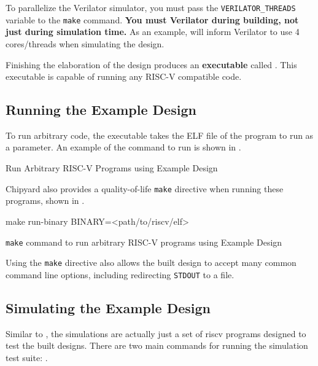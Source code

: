 \begin{blackbox}
  To parallelize the Verilator simulator, you must pass the \texttt{VERILATOR\_THREADS} variable to the \texttt{make} command.
  \textbf{You must  Verilator during building, not just during simulation time.}
  As an example,  will inform Verilator to use 4 cores/threads when simulating the design.
\end{blackbox}

Finishing the \gls{elaboration} of the design produces an \textbf{executable} called .
This executable is capable of running any RISC-V compatible code.

\subsection{Running the Example Design}\label{sec:Running_Example_Design}
To run arbitrary code, the executable takes the ELF file of the program to run as a parameter.
An example of the command to run is shown in .

\begin{listing}[h!tbp]
\caption{Run Arbitrary RISC-V Programs using Example Design}
\label{lst:Running_Example_Design}
\end{listing}

Chipyard also provides a quality-of-life \texttt{make} directive when running these programs, shown in .

\begin{listing}[h!tbp]
\begin{bashsource}
make run-binary BINARY=<path/to/riscv/elf>
\end{bashsource}
\caption{\texttt{make} command to run arbitrary RISC-V programs using Example Design}
\label{lst:Running_Example_Design-Make}
\end{listing}

Using the \texttt{make} directive also allows the built design to accept many common command line options, including redirecting \texttt{STDOUT} to a file.

\subsection{Simulating the Example Design}\label{sec:Simulating_Example_Design}
Similar to , the simulations are actually just a set of \Gls{riscv} programs designed to test the built designs.
There are two main commands for running the simulation test suite: .

